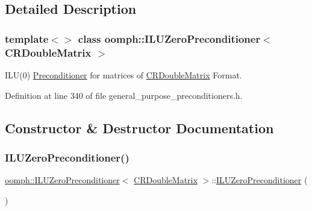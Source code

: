 \subsection{Detailed Description}
\subsubsection*{template$<$$>$\newline
class oomph\+::\+I\+L\+U\+Zero\+Preconditioner$<$ C\+R\+Double\+Matrix $>$}

I\+L\+U(0) \hyperlink{classoomph_1_1Preconditioner}{Preconditioner} for matrices of \hyperlink{classoomph_1_1CRDoubleMatrix}{C\+R\+Double\+Matrix} Format. 

Definition at line 340 of file general\+\_\+purpose\+\_\+preconditioners.\+h.



\subsection{Constructor \& Destructor Documentation}
\mbox{\label{classoomph_1_1ILUZeroPreconditioner_3_01CRDoubleMatrix_01_4_a2a2831a593826062e795bca285439cf7}} 
\subsubsection{\texorpdfstring{I\+L\+U\+Zero\+Preconditioner()}{ILUZeroPreconditioner()}\hspace{0.1cm}{\footnotesize\ttfamily [1/2]}}
{\footnotesize\ttfamily \hyperlink{classoomph_1_1ILUZeroPreconditioner}{oomph\+::\+I\+L\+U\+Zero\+Preconditioner}$<$ \hyperlink{classoomph_1_1CRDoubleMatrix}{C\+R\+Double\+Matrix} $>$\+::\hyperlink{classoomph_1_1ILUZeroPreconditioner}{I\+L\+U\+Zero\+Preconditioner} (\begin{DoxyParamCaption}{ }\end{DoxyParamCaption})\hspace{0.3cm}{\ttfamily [inline]}}




